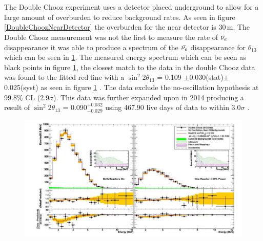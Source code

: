 \\\\The Double Chooz experiment uses a detector placed underground to allow for a large amount of overburden to reduce background rates. As seen in figure \ref{DoubleChoozNearDetector} the overburden for the near detector is 30\,m\cite{lasserre2006}. The Double Chooz measurement  was not the first to measure the rate of $\Bar{\nu_e}$ disappearance \cite{reno_may_2012} it was able to produce a spectrum of the $\Bar{\nu_e}$ disappearance for $\theta_{13}$ which can be seen in \ref{doubleChoozSpectrumNoCaption}. The measured energy spectrum which can be seen as black points in figure \ref{doubleChoozSpectrumNoCaption}, the closest match to the data in the double Chooz data was found to the fitted red line with a $\sin^2{2\theta_{13}}$ = 0.109 $\pm$0.030(stat)$\pm$0.025(syst) as seen in figure \ref{doubleChoozSpectrumNoCaption} \cite{Abe_2012}. The data exclude the no-oscillation hypothesis at 99.8$\%$ CL (2.9$\sigma$)\cite{Abe_2012}. This data was further expanded upon in 2014 producing a result of $\sin^2{2\theta_{13}}$ = 0.090$^{+0.032}_{-0.029}$ using 467.90 live days of data to within $3.0\sigma$ \cite{abe2014improved}.
\begin{figure}[!h]
 \centering
 \includegraphics[width=\linewidth]{Chapter2/Figs/Raster/doubleChoozSpectrumNoCaption.png} %
 \label{doubleChoozSpectrumNoCaption}
\end{figure}

